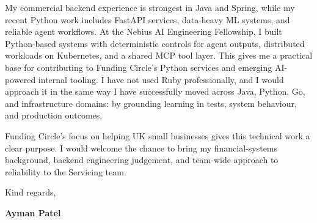 \documentclass[a4paper,11pt]{article}
\begin{document}
My commercial backend experience is strongest in Java and Spring, while my recent Python work includes FastAPI services, data-heavy ML systems, and reliable agent workflows. At the Nebius AI Engineering Fellowship, I built Python-based systems with deterministic controls for agent outputs, distributed workloads on Kubernetes, and a shared MCP tool layer. This gives me a practical base for contributing to Funding Circle's Python services and emerging AI-powered internal tooling. I have not used Ruby professionally, and I would approach it in the same way I have successfully moved across Java, Python, Go, and infrastructure domains: by grounding learning in tests, system behaviour, and production outcomes.

Funding Circle's focus on helping UK small businesses gives this technical work a clear purpose. I would welcome the chance to bring my financial-systems background, backend engineering judgement, and team-wide approach to reliability to the Servicing team.

\vspace{6pt}
Kind regards,

\vspace{6pt}
{\color{accent}\textbf{Ayman Patel}}
\end{document}
